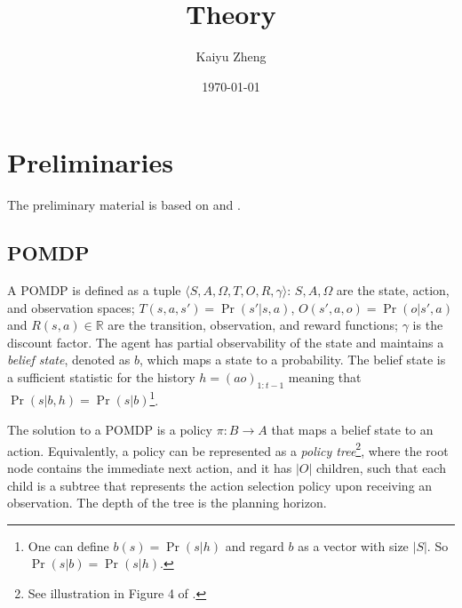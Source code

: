 \documentclass{article}
\title{Theory}
\author{Kaiyu Zheng}
\date{\today}
\begin{document}
\maketitle

\section{Preliminaries}

The preliminary material is based on \citet{kaelbling1998planning} and \citet{pineau2003point}.

\subsection{POMDP}
A POMDP is defined as a tuple
$\langle S, A, \Omega, T, O, R, \gamma \rangle$: $S, A, \Omega$ are the state,
action, and observation spaces; $T(s,a,s')=\Pr(s'|s,a)$, $O(s',a,o)=\Pr(o|s',a)$
and $R(s,a)\in\mathbb{R}$ are the transition, observation, and reward functions;
$\gamma$ is the discount factor. The agent has partial observability of the
state and maintains a \emph{belief state}, denoted as $b$, which maps a state to
a probability. The belief state is a sufficient statistic for the history $h=(ao)_{1:t-1}$
meaning that $\Pr(s|b,h)=\Pr(s|b)$\footnote{One can define $b(s)=\Pr(s|h)$ and regard $b$ as a vector with size $|S|$. So $\Pr(s|b)=\Pr(s|h)$.}.


The solution to a POMDP is a policy $\pi:B\rightarrow A$ that maps a belief
state to an action. Equivalently, a policy can be represented as a \emph{policy tree}\footnote{See illustration in Figure 4 of
  \citet{kaelbling1998planning}.}, where the root node contains the immediate
next action, and it has $|O|$ children, such that each child is a subtree that represents the action selection policy upon receiving an observation. The depth of the tree is the planning horizon.
\end{document}
